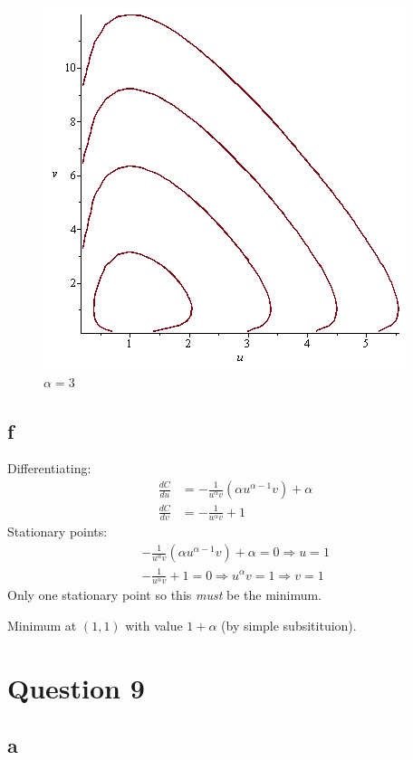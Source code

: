 \documentclass{unswmaths}
\begin{document}
\begin{figure}[H]
    \includegraphics[scale=0.5]{orbits_3}
    \caption{$\alpha = 3$}
\end{figure}
\subsection*{f}
    Differentiating:
    \begin{align*}
        \frac{dC}{du} &= -\frac{1}{u^\alpha v} ( \alpha u^{\alpha-1} v ) + \alpha \\
        \frac{dC}{dv} &= -\frac{1}{u^\alpha v} + 1
    \end{align*}
    Stationary points:
    \begin{align*}
        -\frac{1}{u^\alpha v} ( \alpha u^{\alpha-1} v ) + \alpha = 0 \Longrightarrow u = 1 \\
        -\frac{1}{u^\alpha v} + 1 = 0 \Longrightarrow u^\alpha v = 1 \Longrightarrow v = 1
    \end{align*}
    Only one stationary point so this \emph{must} be the minimum. 
    
    Minimum at $ (1,1) $ with value $ 1 + \alpha $ (by simple subsitituion).
\section*{Question 9}
\subsection*{a}
\begin{figure}[H]
\end{figure}
\end{document}
